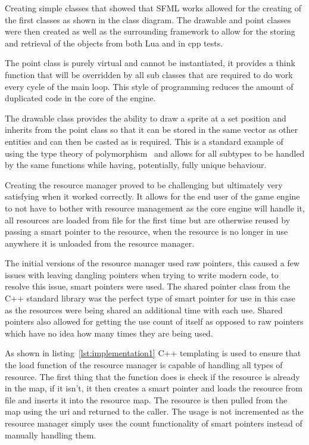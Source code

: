 \documentclass[11pt,a4paper,titlepage]{report}
\begin{document}
    Creating simple classes that showed that SFML works allowed for the creating of the first classes as shown in the class diagram. The drawable and point classes were then created as well as the surrounding framework to allow for the storing and retrieval of the objects from both Lua and in cpp tests.

    The point class is purely virtual and cannot be instantiated, it provides a think function that will be overridden by all sub classes that are required to do work every cycle of the main loop. This style of programming reduces the amount of duplicated code in the core of the engine.

    The drawable class provides the ability to draw a sprite at a set position and inherits from the point class so that it can be stored in the same vector as other entities and can then be casted as is required. This is a standard example of using the type theory of polymorphism~\cite{PolymorphismDef} and allows for all subtypes to be handled by the same functions while having, potentially, fully unique behaviour.
	

	Creating the resource manager proved to be challenging but ultimately very satisfying when it worked correctly. It allows for the end user of the game engine to not have to bother with resource management as the core engine will handle it, all resources are loaded from file for the first time but are otherwise reused by passing a smart pointer to the resource, when the resource is no longer in use anywhere it is unloaded from the resource manager.

	The initial versions of the resource manager used raw pointers, this caused a few issues with leaving dangling pointers when trying to write modern code, to resolve this issue, smart pointers were used. The shared pointer class from the C++ standard library was the perfect type of smart pointer for use in this case as the resources were being shared an additional time with each use. Shared pointers also allowed for getting the use count of itself as opposed to raw pointers which have no idea how many times they are being used.
	
	\singlespacing
	
	\onehalfspacing

	As shown in listing~\ref{lst:implementation1} C++ templating is used to ensure that the load function of the resource manager is capable of handling all types of resource. The first thing that the function does is check if the resource is already in the map, if it isn't, it then creates a smart pointer and loads the resource from file and inserts it into the resource map. The resource is then pulled from the map using the uri and returned to the caller. The usage is not incremented as the resource manager simply uses the count functionality of smart pointers instead of manually handling them.
\end{document}
